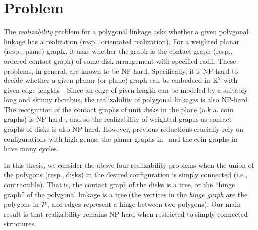 \section{Problem}
The \emph{realizability} problem for a polygonal linkage asks whether a given polygonal linkage has 
a realization (resp., orientated realization). For a weighted planar (resp., plane) graph,, it asks 
whether the graph is
the contact graph (resp., ordered contact graph) of some disk arrangement with specified radii. 
These problems, in general, are known to be NP-hard. Specifically, it is NP-hard to decide whether a 
given planar (or plane) graph can be embedded in $\mathbb{R}^2$ with given edge lengths~\cite{CDD+10,EW90}. 
Since an edge of given length can be modeled by a suitably long and skinny rhombus, the 
realizability of polygonal linkages is also NP-hard. The recognition of the contact graphs of unit 
disks in the plane (a.k.a. coin graphs) is NP-hard~\cite{BK98}, and so the realizability of weighted 
graphs as contact graphs of disks is also NP-hard. However, previous reductions crucially rely on 
configurations with high genus: the planar graphs in~\cite{CDD+10,EW90} and the coin graphs 
in~\cite{BK98} have many cycles.

In this thesis, we consider the above four realizability problems when the union of the polygons 
(resp., disks) in the desired configuration is simply connected (i.e., contractible). That is, the 
contact graph of the disks is a tree, or the ``hinge graph'' of the polygonal linkage is a tree (the 
vertices in the \emph{hinge graph} are the polygons in ${\cal P}$, and edges represent a hinge between 
two polygons). Our main result is that realizability remains NP-hard when restricted to simply 
connected structures.
 
